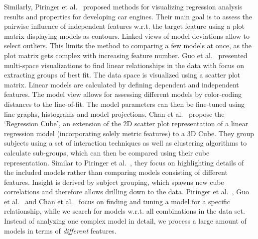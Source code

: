 \documentclass[journal]{style/vgtc} 			          %
\begin{document}
Similarly, Piringer et al.~\cite{Piringer} proposed methods for visualizing regression analysis results and properties for developing car engines.
Their main goal is to assess the pairwise influence of independent features w.r.t. the target feature using a plot matrix displaying models as contours.
Linked views of model deviations allow to select outliers.
This limits the method to comparing a few models at once, as the plot matrix gets complex with increasing feature number.
Guo et al.~\cite{Guo} presented multi-space visualizations to find linear relationships in the data with focus on extracting groups of best fit.
The data space is visualized using a scatter plot matrix.
Linear models are calculated by defining dependent and independent features.
The model view allows for assessing different models by color-coding distances to the line-of-fit.
The model parameters can then be fine-tuned using line graphs, histograms and model projections.
Chan et al.~\cite{Chan} propose the `Regression Cube', an extension of the 2D scatter plot representation of a linear regression model (incorporating solely metric features) to a 3D Cube.
They group subjects using a set of interaction techniques as well as clustering algorithms to calculate sub-groups, which can then be compared using their cube representation.
Similar to Piringer et al.~\cite{Piringer}, they focus on highlighting details of the included models rather than comparing models consisting of different features.
Insight is derived by subject grouping, which spawns new cube correlations and therefore allows drilling down to the data.
Piringer et al.~\cite{Piringer}, Guo et al.~\cite{Guo} and Chan et al.~\cite{Chan} focus on finding and tuning a model for a specific relationship, while we search for models w.r.t. all combinations in the data set.
Instead of analyzing one complex model in detail, we process a large amount of models in terms of \emph{different} features.
\end{document}
